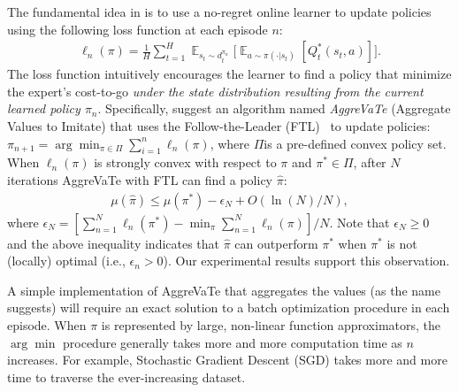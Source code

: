 \documentclass{article}
\newcommand{\BB}[1]{\textcolor{red}{\bf Byron: {#1}}}
\newcommand{\drew}[1]{\textcolor{blue}{\bf Drew: {#1}}}
\begin{document}
The fundamental idea in \citet{ross2014reinforcement} is to use a no-regret online learner to update policies using the following loss function at each episode $n$:
\begin{align}
\label{eq:general_loss}
\ell_{n}(\pi) = \frac{1}{H}\sum_{t=1}^H \mathop{\mathbb{E}}_{s_t\sim d_t^{\pi_n}}\Big[\mathop{\mathbb{E}}_{a \sim \pi(\cdot | s_t)}[Q_t^*(s_t,a)]\Big].
\end{align}
The loss function intuitively encourages the learner to find a policy that minimize the expert's cost-to-go \emph{under the state distribution resulting from the current learned policy $\pi_n$}.
Specifically, \citet{ross2014reinforcement} suggest an algorithm named \emph{AggreVaTe} (Aggregate Values to Imitate) that uses the Follow-the-Leader (FTL)~\cite{shalev2012online} to update policies:$\pi_{n+1} = \arg\min_{\pi\in\Pi}\sum_{i=1}^{n}\ell_n(\pi)$, %
where $\Pi$is a pre-defined convex policy set.
When $\ell_n(\pi)$ is strongly convex with respect to $\pi$ and $\pi^*\in \Pi$, after $N$ iterations AggreVaTe with FTL can find a policy $\hat{\pi}$:
\begin{align}
\label{eq:AggreVaTe_analysis}
\mu(\hat{\pi}) \leq \mu(\pi^*) - \epsilon_N + {O}(\ln(N)/{N}),
\end{align} where $\epsilon_N =[\sum_{n=1}^N\ell_n(\pi^*) - \min_{\pi}\sum_{n=1}^N\ell_n(\pi)]/N$. Note that $\epsilon_N\geq 0$ and the above inequality indicates that $\hat{\pi}$ can outperform $\pi^*$ when $\pi^*$ is not (locally) optimal (i.e., $\epsilon_n > 0$). Our experimental results support this observation.

A simple implementation of AggreVaTe that aggregates the values (as the name suggests) will require an exact solution to a batch optimization procedure in each episode. 
When $\pi$ is represented by large, non-linear function approximators, the $\arg\min$ procedure generally takes more and more computation time as $n$ increases. For example, Stochastic Gradient Descent (SGD) takes more and more time to traverse the ever-increasing dataset. 
\end{document}
